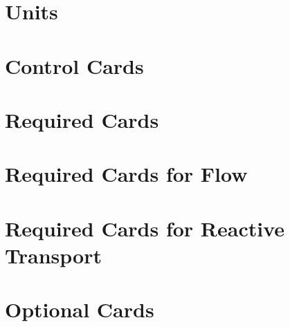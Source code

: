 \documentclass{beamer}
\begin{document}
\section{Units}


\section{Control Cards}



\section{Required Cards}








\section{Required Cards for Flow}


\section{Required Cards for Reactive Transport}




\section{Optional Cards}




\end{document}

